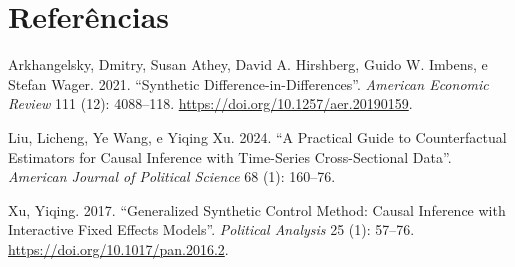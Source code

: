 \documentclass[
  brazilian,
  11pt,
]{article}
\newlength{\cslhangindent}
\newenvironment{CSLReferences}[2] %
 {\begin{list}{}{%
  \setlength{\itemindent}{0pt}
  \setlength{\leftmargin}{0pt}
  \setlength{\parsep}{0pt}
  \ifodd #1
   \setlength{\leftmargin}{\cslhangindent}
   \setlength{\itemindent}{-1\cslhangindent}
  \fi
  \setlength{\itemsep}{#2\baselineskip}}}
 {\end{list}}
\begin{document}
\section{Referências}\label{referuxeancias}

\footnotesize

\protect{}\label{refs}
\begin{CSLReferences}{1}{0}
Arkhangelsky, Dmitry, Susan Athey, David A. Hirshberg, Guido W. Imbens,
e Stefan Wager. 2021. {``Synthetic {Difference-in-Differences}''}.
\emph{American Economic Review} 111 (12): 4088--118.
\url{https://doi.org/10.1257/aer.20190159}.

Liu, Licheng, Ye Wang, e Yiqing Xu. 2024. {``A Practical Guide to
Counterfactual Estimators for Causal Inference with Time-Series
Cross-Sectional Data''}. \emph{American Journal of Political Science} 68
(1): 160--76.

Xu, Yiqing. 2017. {``Generalized Synthetic Control Method: Causal
Inference with Interactive Fixed Effects Models''}. \emph{Political
Analysis} 25 (1): 57--76. \url{https://doi.org/10.1017/pan.2016.2}.

\end{CSLReferences}
\end{document}
